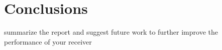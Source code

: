\section{Conclusions}
summarize the report and suggest future work to further improve the performance of your receiver